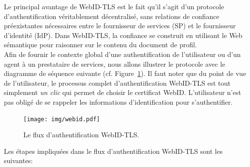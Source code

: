 \documentclass[a4paper]{article}
\begin{document}
Le principal avantage de WebID-TLS est le fait qu'il s'agit d'un protocole d'authentification véritablement décentralisé, sans relations de confiance préexistantes nécessaires entre le fournisseur de services (SP) et le fournisseur d'identité (IdP). Dans WebID-TLS, la confiance se construit en utilisant le Web sémantique pour raisonner sur le contenu du document de profil.\\


Afin de fournir le contexte global d'une authentification de l'utilisateur ou d'un agent à un prestataire de services, nous allons illustrer le protocole avec le diagramme de séquence suivante (cf. Figure~\ref{fig:webid-flow}). Il faut noter que du point de vue de l'utilisateur, le processus complet d'authentification WebID-TLS est tout simplement \textit{un clic} qui permet de choisir le certificat WebID. L'utilisateur n'est pas obligé de se rappeler les informations d'identification pour s'authentifier.\\

\begin{figure}[h]
  \begin{center}
    \texttt{[image: img/webid.pdf]}
        \caption{Le flux d'authentification WebID-TLS.}
        \label{fig:webid-flow}
  \end{center}
\end{figure}

Les étapes impliquées dans le flux d'authentification WebID-TLS sont les suivantes:
\end{document}
